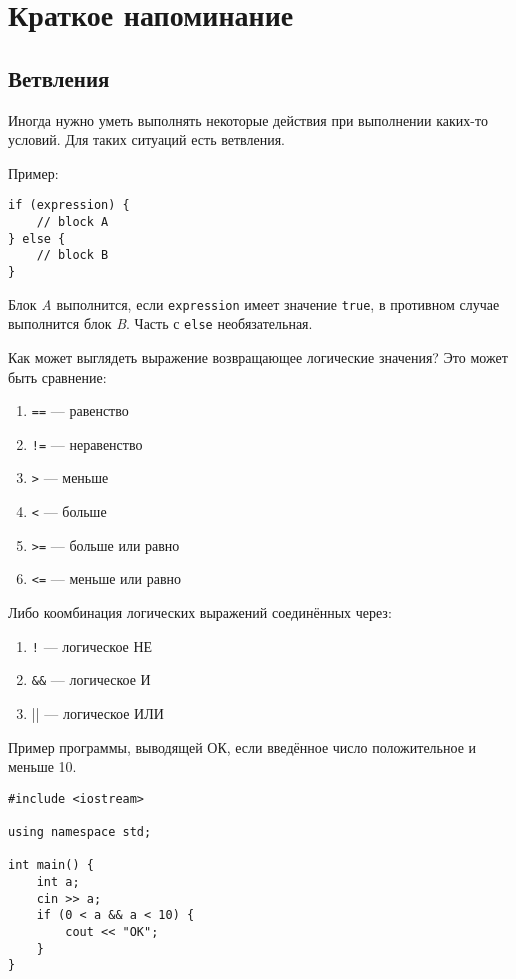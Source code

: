 \documentclass[10pt,a4paper]{article}
\begin{document}
\section*{Краткое напоминание}


\subsection*{Ветвления}

Иногда нужно уметь выполнять некоторые действия при выполнении
каких-то условий. Для таких ситуаций есть ветвления.


Пример:
\begin{lstlisting}
if (expression) {
    // block A
} else {
    // block B
}
\end{lstlisting}


Блок \textit{A} выполнится, если \lstinline|expression| имеет 
значение \lstinline|true|, в противном случае выполнится блок \textit{B}.
Часть с \lstinline|else| необязательная.

Как может выглядеть выражение возвращающее логические значения?
Это может быть сравнение:

\begin{enumerate}
\item \lstinline|==| --- равенство
\item \lstinline|!=| --- неравенство
\item \lstinline|>| --- меньше
\item \lstinline|<| --- больше
\item \lstinline|>=| --- больше или равно
\item \lstinline|<=| --- меньше или равно
\end{enumerate}

Либо коомбинация логических выражений соединённых через:

\begin{enumerate}
\item \lstinline|!| --- логическое НЕ
\item \lstinline|&&| --- логическое И
\item || --- логическое ИЛИ
\end{enumerate}

Пример программы, выводящей ОК, если введённое число положительное
и меньше 10.

\begin{lstlisting}
#include <iostream>

using namespace std;

int main() {
    int a;
    cin >> a;
    if (0 < a && a < 10) {
        cout << "OK";
    }
}
\end{lstlisting}
\end{document}
